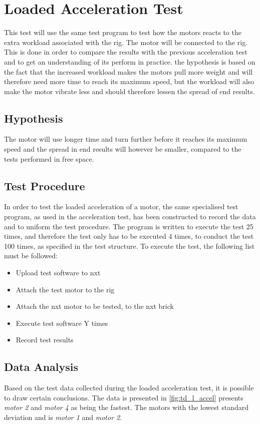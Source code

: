 \section{Loaded Acceleration Test} %
This test will use the same test program to test how the motors reacts to the extra workload associated with the rig. The motor will be connected to the rig. This is done in order to compare the results with the previous acceleration test and to get an understanding of its perform in practice. the hypothesis is based on the fact that the increased workload makes the motors pull more weight and will therefore need more time to reach its maximum speed, but the workload will also make the motor vibrate less and should therefore lessen the spread of end results.

\subsection{Hypothesis} The motor will use longer time and turn further before it reaches its maximum speed and the spread in end results will however be smaller, compared to the tests performed in free space.

\subsection{Test Procedure}
In order to test the loaded acceleration of a motor, the same specialised test program, as used in the acceleration test, has been constructed to record the data and to uniform the test procedure. The program is written to execute the test 25 times, and therefore the test only has to be executed 4 times, to conduct the test 100 times, as specified in the test structure. To execute the test, the following list must be followed:

\begin{itemize}
	\item Upload test software to \gls{nxt}
	\item Attach the test motor to the rig
  	\item Attach the \gls{nxt} motor to be tested, to the \gls{nxt} brick
	\item Execute test software Y times
	\item Record test results
\end{itemize}

\subsection{Data Analysis}
Based on the test data collected during the loaded acceleration test, it is possible to draw certain conclusions. The data is presented in \cref{fig:td_l_accel} presents \emph{motor 2} and \emph{motor 4} as being the fastest. The motors with the lowest standard deviation and is \emph{motor 1} and \emph{motor 2}.

